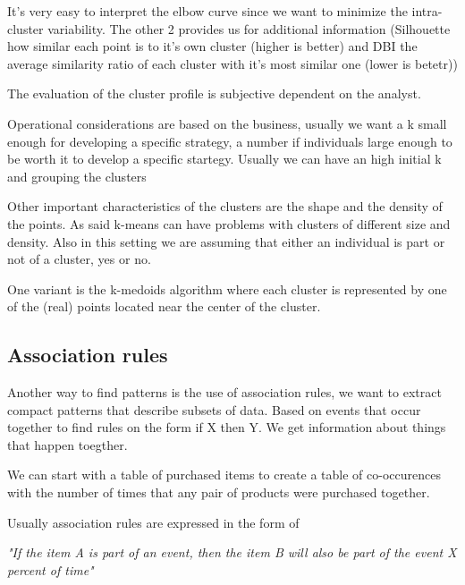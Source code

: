 It's very easy to interpret the elbow curve since we want to minimize the intra-cluster variability. The other 2 provides us for additional information (Silhouette how similar each point is to it's own cluster (higher is better) and DBI the average similarity ratio 
of each cluster with it's most similar one (lower is betetr))

The evaluation of the cluster profile is subjective dependent on the analyst.

Operational considerations are based on the business, usually we want a k small enough for developing a specific strategy,
a number if individuals large enough to be worth it to develop a specific startegy. Usually we can have an high initial k and grouping the clusters

\vspace{10pt}

Other important characteristics of the clusters are the shape and the density of the points. As said k-means can have problems with clusters of different size and density.
Also in this setting we are assuming that either an individual is part or not of a cluster, yes or no.

One variant is the k-medoids algorithm where each cluster is represented by one of the (real) points located near the center of the cluster.

\vspace{10pt}


\subsection{Association rules}

Another way to find patterns is the use of association rules, we want to extract compact patterns that describe subsets of data. Based on events that occur together to find rules on the form if X then Y. We get information about things that happen toegther. 

\vspace{10pt}

We can start with a table of purchased items to create a table of co-occurences with the number of times that any pair of products were purchased together. 

Usually association rules are expressed in the form of 

\begin{center}
\textit{"If the item A is part of an event, then the item B will also be part of the event X percent of time"}
\end{center}


